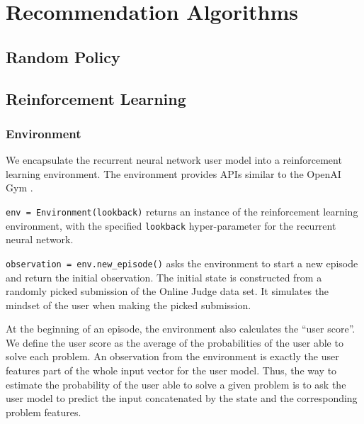 
\chapter{Recommendation Algorithms}


\section{Random Policy}


\section{Reinforcement Learning}

    \subsection{Environment}

        We encapsulate the recurrent neural network user model into a reinforcement learning environment.
        The environment provides APIs similar to the OpenAI Gym \cite{brockman_openai_2016}.

        \verb|env = Environment(lookback)| returns an instance of the reinforcement learning environment,
        with the specified \verb|lookback| hyper-parameter for the recurrent neural network.

        \verb|observation = env.new_episode()| asks the environment to start a new episode and return the initial observation.
        The initial state is constructed from a randomly picked submission of the Online Judge data set.
        It simulates the mindset of the user when making the picked submission.

        At the beginning of an episode, the environment also calculates the ``user score''.
        We define the user score as the average of the probabilities of the user able to solve each problem.
        An observation from the environment is exactly the user features part of the whole input vector for the user model.
        Thus, the way to estimate the probability of the user able to solve a given problem
        is to ask the user model to predict the input concatenated by the state and the corresponding problem features.

